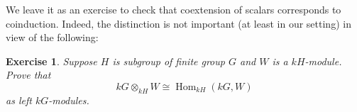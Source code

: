 \documentclass[12pt]{article}
\theoremstyle{plain}
\newtheorem{exercise}[theorem]{Exercise}
\theoremstyle{definition}
\theoremstyle{remark}
\numberwithin{equation}{section}
\begin{document}
We leave it as an exercise to check that coextension of scalars
corresponds to coinduction.  Indeed, the distinction is not important
(at least in our setting) in view of the following:

\begin{exercise}
Suppose $H$ is subgroup of finite group $G$ and $W$ is a $kH$-module.
Prove that
\[
kG \otimes_{kH} W \cong \operatorname{Hom}_{kH}(kG,W)
\]
as left $kG$-modules.
\end{exercise}



\end{document}
